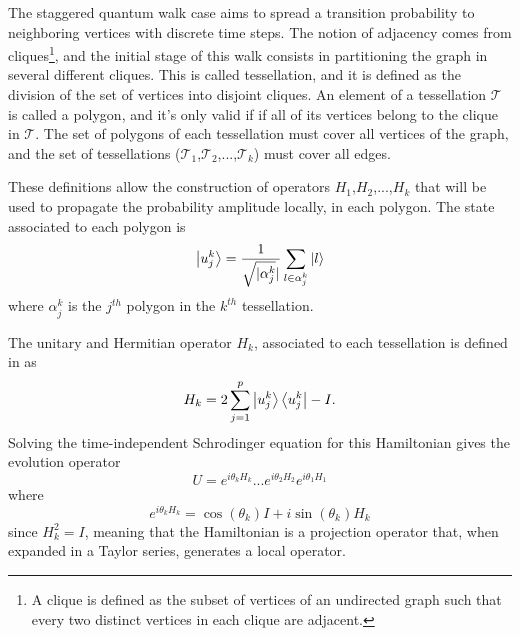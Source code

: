 \documentclass[../../dissertation.tex]{subfiles}
\begin{document}
The staggered quantum walk case aims to spread a transition probability to
neighboring vertices with discrete time steps. The notion of adjacency comes
from cliques\footnote{A clique is defined as the subset of vertices of an
	undirected graph such that every two distinct vertices in each clique
are adjacent.}, and the initial stage of this walk consists in partitioning the
graph in several different cliques. This is called tessellation, and it is
defined as the division of the set of vertices into disjoint cliques. An
element of a tessellation $\mathscr{T}$ is called a polygon, and it's only
valid if if all of its vertices belong to the clique in $\mathscr{T}$. The set
of polygons of each tessellation must cover all vertices of the graph, and the
set of tessellations
($\mathscr{T}_{1}$,$\mathscr{T}_{2}$,...,$\mathscr{T}_{k}$) must cover all
edges.\par 

These definitions allow the construction of operators $H_1$,$H_2$,...,$H_k$
that will be used to propagate the probability amplitude locally, in each
polygon. The state associated to each polygon is
\begin{equation}
	\ket{u_{j}^{k}} = \frac{1}{\sqrt{\mathopen|\alpha_{j}^{k}}\mathclose|}\sum_{l\in\alpha_{j}^{k}}\ket{l}
\end{equation}
where $\alpha_{j}^{k}$ is the $j^{th}$ polygon in the $k^{th}$ tessellation.\par

The unitary and Hermitian operator $H_k$, associated to each tessellation is
defined in \cite{portugal2017b} as
\begin{equation}
	H_k = 2\sum_{j=1}^{p}\ket{u_{j}^{k}}\bra{u_{j}^{k}} - I.
	\label{eq:StagHamil}
\end{equation}
Solving the time-independent Schrodinger equation for this Hamiltonian gives
the evolution operator 
\begin{equation}
	U = e^{i\theta_{k}H_{k}}...e^{i\theta_{2}H_{2}}e^{i\theta_{1}H_{1}}
	\label{eq:stagWalkUnmodOp}
\end{equation}
where
\begin{equation}
	e^{i\theta_{k}H_{k}} = \cos{(\theta_k)}I + i\sin{(\theta_k)}H_k
\end{equation}
since $H_k^2 = I$, meaning that the Hamiltonian is a projection operator that,
when expanded in a Taylor series, generates a local operator.\par
\end{document}
